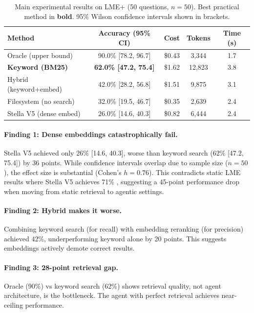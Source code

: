 \documentclass{article}
\begin{document}
\begin{table}[t]
\caption{Main experimental results on LME+ (50 questions, $n=50$). Best practical method in \textbf{bold}. 95\% Wilson confidence intervals shown in brackets.}
\label{tab:main}
\centering
\begin{tabular}{lcccc}
\toprule
Method & Accuracy (95\% CI) & Cost & Tokens & Time (s) \\
\midrule
Oracle (upper bound) & 90.0\% [78.2, 96.7] & \$0.43 & 3,344 & 1.7 \\
\textbf{Keyword (BM25)} & \textbf{62.0\% [47.2, 75.4]} & \$1.62 & 12,823 & 3.8 \\
Hybrid (keyword+embed) & 42.0\% [28.2, 56.8] & \$1.51 & 9,875 & 3.1 \\
Filesystem (no search) & 32.0\% [19.5, 46.7] & \$0.35 & 2,639 & 2.4 \\
Stella V5 (dense embed) & 26.0\% [14.6, 40.3] & \$0.82 & 6,444 & 2.4 \\
\bottomrule
\end{tabular}
\end{table}

\paragraph{Finding 1: Dense embeddings catastrophically fail.}
Stella V5 achieved only 26\% [14.6, 40.3], worse than keyword search (62\% [47.2, 75.4]) by 36 points. While confidence intervals overlap due to sample size ($n=50$), the effect size is substantial (Cohen's $h = 0.76$). This contradicts static LME results where Stella V5 achieves 71\% \cite{wu2024longmemeval}, suggesting a 45-point performance drop when moving from static retrieval to agentic settings.

\paragraph{Finding 2: Hybrid makes it worse.}
Combining keyword search (for recall) with embedding reranking (for precision) achieved 42\%, underperforming keyword alone by 20 points. This suggests embeddings actively demote correct results.

\paragraph{Finding 3: 28-point retrieval gap.}
Oracle (90\%) vs keyword search (62\%) shows retrieval quality, not agent architecture, is the bottleneck. The agent with perfect retrieval achieves near-ceiling performance.
\end{document}
